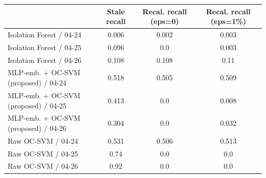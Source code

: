 \begin{tabular}{lccc}
\toprule
 & Stale recall & Recal. recall (eps=0) & Recal. recall (eps=1\%) \\
\midrule
Isolation Forest / 04-24 & 0.006 & 0.002 & 0.003 \\
Isolation Forest / 04-25 & 0.096 & 0.0 & 0.003 \\
Isolation Forest / 04-26 & 0.108 & 0.108 & 0.11 \\
MLP-emb. + OC-SVM (proposed) / 04-24 & 0.518 & 0.505 & 0.509 \\
MLP-emb. + OC-SVM (proposed) / 04-25 & 0.413 & 0.0 & 0.008 \\
MLP-emb. + OC-SVM (proposed) / 04-26 & 0.304 & 0.0 & 0.032 \\
Raw OC-SVM / 04-24 & 0.531 & 0.506 & 0.513 \\
Raw OC-SVM / 04-25 & 0.74 & 0.0 & 0.0 \\
Raw OC-SVM / 04-26 & 0.92 & 0.0 & 0.0 \\
\bottomrule
\end{tabular}